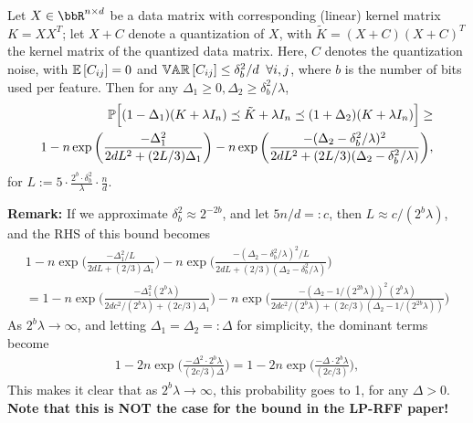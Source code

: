 \documentclass[12pt]{article}
\newcommand{\tK}{\tilde{K}}
\newcommand{\defeq}{:=}
\newcommand{\eqdef}{=:}
\begin{document}
\begin{theorem}
	\label{thm2}
	Let $X \in \RR^{n\times d}$ be a data matrix with corresponding (linear) kernel matrix $K = XX^T$; let $X+C$ denote a quantization of $X$, with $\tK = (X+C)(X+C)^T$ the kernel matrix of the quantized data matrix. Here, $C$ denotes the quantization noise, with $\expect{}{C_{ij}} = 0$ and $\var{}{C_{ij}} \leq \delta_b^2/d \;\;\forall i,j$, where $b$ is the number of bits used per feature.
	Then for any $\Delta_1 \geq 0, \Delta_2 \geq \delta^2_b/\lambda$,
	\begin{eqnarray}
	\Prob\Big[(1 - \Delta_1) (K + \lambda I_n) \preceq \tK + \lambda I_n \preceq (1 + \Delta_2) (K + \lambda I_n)
	\Big] 
	\geq \\ 1 - 
	n \exp \bigg(\frac{-\Delta_1^2}{2dL^2 + (2L/3)\Delta_1}\bigg) -
	n \exp \bigg(\frac{-(\Delta_2-\delta_b^2/\lambda)^2}{2dL^2 + (2L/3)(\Delta_2-\delta_b^2/\lambda)}\bigg),
	\end{eqnarray}
for $L \defeq 5 \cdot \frac{2^b \cdot \delta_b^2}{\lambda}\cdot \frac{n}{d}$.
\end{theorem}

\noindent\textbf{Remark:} If we approximate $\delta_b^2 \approx 2^{-2b}$, and let $5n/d \eqdef c$, then $L \approx c /(2^b \lambda)$, and the RHS of this bound becomes
\begin{eqnarray*}
1 - 
n \exp \bigg(\frac{-\Delta_1^2 /L}{2dL + (2/3)\Delta_1}\bigg) -
n \exp \bigg(\frac{-(\Delta_2-\delta_b^2/\lambda)^2 /L}{2dL + (2/3)(\Delta_2-\delta_b^2/\lambda)}\bigg) \\
= 1 - 
n \exp \bigg(\frac{-\Delta_1^2 (2^b \lambda)}{2dc^2/(2^b \lambda) + (2c/3)\Delta_1}\bigg) -
n \exp \bigg(\frac{-(\Delta_2-1/(2^{2b}\lambda))^2 (2^b \lambda)}{2dc^2/(2^b \lambda) + (2c/3)(\Delta_2-1/(2^{2b}\lambda))}\bigg)
\end{eqnarray*}
As $2^b \lambda \rightarrow \infty$, and letting $\Delta_1=\Delta_2\eqdef \Delta$ for simplicity, the dominant terms become
\begin{eqnarray*}
1 - 2n \exp \Bigg(\frac{-\Delta^2 \cdot 2^b \lambda}{(2c/3)\Delta}\Bigg) = 1 - 2n \exp \Bigg(\frac{-\Delta \cdot 2^b \lambda}{(2c/3)}\Bigg),
\end{eqnarray*}
This makes it clear that as $2^b \lambda \rightarrow \infty$, this probability goes to 1, for any $\Delta > 0$.  \textbf{Note that this is NOT the case for the bound in the LP-RFF paper!}
\end{document}
